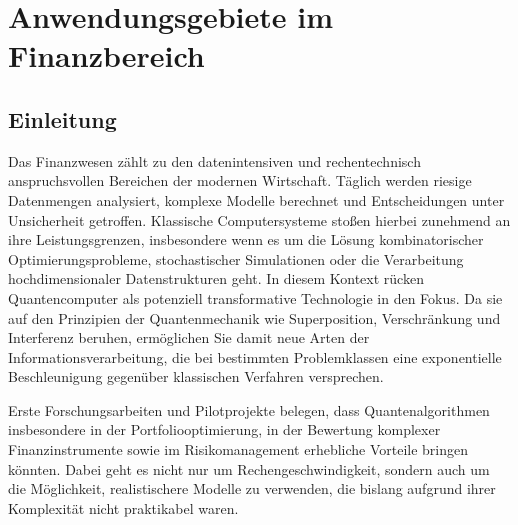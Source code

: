 \chapter{Anwendungsgebiete im Finanzbereich}
\label{trends} %




\section{Einleitung}
Das Finanzwesen zählt zu den datenintensiven und rechentechnisch anspruchsvollen Bereichen der modernen Wirtschaft. Täglich werden riesige Datenmengen analysiert, komplexe Modelle berechnet und Entscheidungen unter Unsicherheit getroffen. Klassische Computersysteme stoßen hierbei zunehmend an ihre Leistungsgrenzen, insbesondere wenn es um die Lösung kombinatorischer Optimierungsprobleme, stochastischer Simulationen oder die Verarbeitung hochdimensionaler Datenstrukturen geht. In diesem Kontext rücken Quantencomputer als potenziell transformative Technologie in den Fokus. Da sie auf den Prinzipien der Quantenmechanik wie Superposition, Verschränkung und Interferenz beruhen, ermöglichen Sie damit neue Arten der Informationsverarbeitung, die bei bestimmten Problemklassen eine exponentielle Beschleunigung gegenüber klassischen Verfahren versprechen.

Erste Forschungsarbeiten und Pilotprojekte belegen, dass Quantenalgorithmen insbesondere in der Portfoliooptimierung, in der Bewertung komplexer Finanzinstrumente sowie im Risikomanagement erhebliche Vorteile bringen könnten. Dabei geht es nicht nur um Rechengeschwindigkeit, sondern auch um die Möglichkeit, realistischere Modelle zu verwenden, die bislang aufgrund ihrer Komplexität nicht praktikabel waren. 

